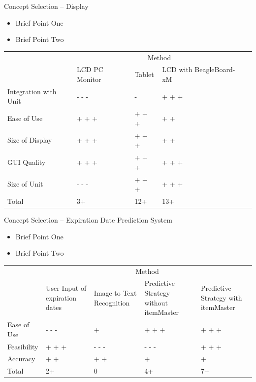 \documentclass{beamer}
\begin{document}
\begin{frame}{Concept Selection -- Display}
\begin{itemize}
\item Brief Point One
\item Brief Point Two
\end{itemize}
\vspace{.5cm}
\footnotesize
\begin{tabular}{| p{1.3in} | p{.7in} | p{0.7in} | p{1.0in} | p{.8in} |}
\cline{2-4}
\multicolumn{1}{c}{}&\multicolumn{3}{|c|}{Method} \\
\cline{2-4}
\multicolumn{1}{c|}{}&LCD PC \newline Monitor&Tablet&LCD with \newline BeagleBoard-xM\\
\hline
Integration with Unit&- - -&-&+ + +\\
\hline
Ease of Use&+ + +&+ + +&+ +\\
\hline
Size of Display& + + + &+ + +&+ +\\
\hline
GUI Quality&+ + +&+ + +&+ + +\\
\hline
Size of Unit&- - -&+ + +&+ + +\\
\hline
\hline
Total&3+&12+&13+\\
\hline
\end{tabular}
\end{frame}

\begin{frame}{Concept Selection -- Expiration Date Prediction System}
\begin{itemize}
\item Brief Point One
\item Brief Point Two
\end{itemize}
\vspace{.5cm}
\footnotesize
\begin{tabular}{| p{.7in} | p{.7in} | p{.8in} | p{.9in} | p{.8in} |}
\cline{2-5}
\multicolumn{1}{c}{}&\multicolumn{4}{|c|}{Method} \\
\cline{2-5}
\multicolumn{1}{c|}{}&User Input \newline of expiration \newline dates& Image to Text \newline Recognition & Predictive \newline Strategy without \newline itemMaster& Predictive \newline Strategy with \newline itemMaster \\
\hline
Ease of Use&- - -&+&+ + +&+ + +\\
\hline
Feasibility&+ + +&- - -&- - -&+ + +\\
\hline
Accuracy & + + & + + &+&+\\
\hline \hline
Total &2+ &0&4+&7+\\
\hline
\end{tabular}
\end{frame}
\end{document}
